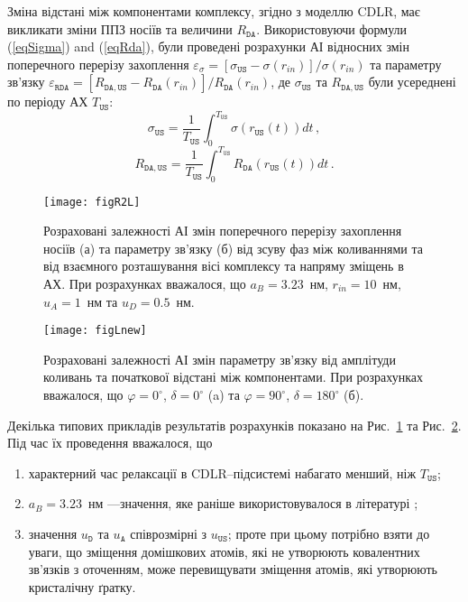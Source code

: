 Зміна відстані між компонентами комплексу, згідно з моделлю CDLR, має викликати зміни
ППЗ носіїв та величини $R_\mathtt{DA}$.
Використовуючи формули (\ref{eqSigma}) and (\ref{eqRda}), були проведені розрахунки
АІ відносних змін поперечного перерізу захоплення
$\varepsilon_\sigma=[\sigma_{\mathtt{US}}-\sigma(r_{in})]/\sigma(r_{in})$
та параметру зв'язку
$\varepsilon_{\mathtt{RDA}}=[R_{\mathtt{DA,US}}-R_\mathtt{DA}(r_{in})]/R_\mathtt{DA}(r_{in})$,
де $\sigma_{\mathtt{US}}$ та $R_{\mathtt{DA,US}}$ були усереднені по періоду АХ $T_\mathtt{US}$:
\begin{equation}
\label{eqAverSigma}
\sigma_{\mathtt{US}}=\frac{1}{T_\mathtt{US}}\int^{T_\mathtt{US}}_0\!\!\!\!\!\!\sigma(r_\mathtt{US}(t))dt\,,
\end{equation}
\begin{equation}
\label{eqAverRda}
R_{\mathtt{DA,US}}=\frac{1}{T_\mathtt{US}}\int^{T_\mathtt{US}}_0\!\!\!\!\!\!R_{\mathtt{DA}}(r_\mathtt{US}(t))dt\,.
\end{equation}


\begin{figure}
\center
\texttt{[image: figR2L]}
\caption{\label{figR2L}
Розраховані залежності  АІ змін поперечного перерізу захоплення носіїв (а) та параметру зв'язку (б) від зсуву фаз між коливаннями та від взаємного
розташування вісі комплексу та напряму зміщень в АХ.
При розрахунках вважалося, що $a_B=3.23$~нм, $r_{in}=10$~нм, $u_A=1$~нм та $u_D=0.5$~нм.
}%
\end{figure}

\begin{figure}
\center
\texttt{[image: figLnew]}
\caption{\label{figLnew}
Розраховані залежності  АІ змін параметру зв'язку від амплітуди коливань та початкової відстані між компонентами.
При розрахунках вважалося, що $\varphi=0^\circ$, $\delta=0^\circ$ (a) та $\varphi=90^\circ$, $\delta=180^\circ$ (б).
}%
\end{figure}

Декілька типових прикладів результатів розрахунків показано на Рис.~\ref{figR2L} та Рис.~\ref{figLnew}.
Під час їх проведення вважалося, що
\begin{enumerate}[label=\asbuk*),leftmargin=0em,itemindent=1.5em]
\item характерний час релаксації в CDLR--підсистемі набагато менший, ніж $T_\mathtt{US}$;
\item $a_B=3.23$~нм ---значення, яке раніше використовувалося в літературі \cite{CDLR:JAP};
\item значення $u_\mathtt{D}$ та $u_\mathtt{A}$ співрозмірні з $u_\mathtt{US}$;
   проте при цьому потрібно взяти до уваги, що зміщення домішкових атомів, які не утворюють ковалентних зв'язків з оточенням, може перевищувати
   зміщення атомів, які утворюють кристалічну ґратку.
\end{enumerate}

